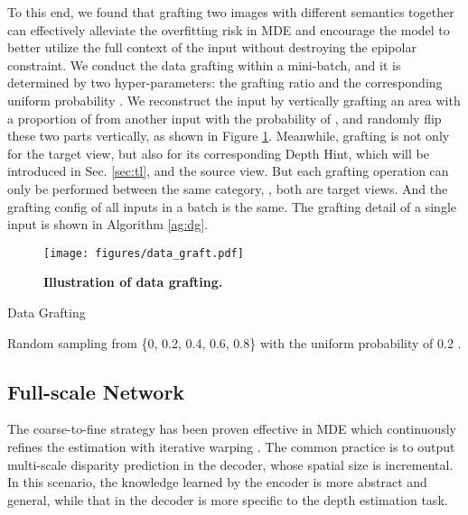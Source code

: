 \documentclass[10pt,twocolumn,letterpaper]{article}
\begin{document}
To this end, we found that grafting two images with different semantics together can 
effectively alleviate the overfitting risk in MDE and encourage the model to better 
utilize the full context of the input without destroying the epipolar constraint. 
We conduct the data grafting within a 
mini-batch, and it is determined by two hyper-parameters: the grafting ratio  and the 
corresponding uniform probability . We reconstruct the input by vertically grafting 
an area with a proportion of  from another input with the probability of , and 
randomly flip these two parts vertically, as shown in Figure \ref{fig:dg}. 
Meanwhile, grafting is not only for the target view, but also for its corresponding 
Depth Hint, which will be introduced in Sec. \ref{sec:tl}, and the source view. 
But each grafting operation can only be performed between the same category, 
\eg, both are target views. And the grafting 
config of all inputs in a batch is the same. The grafting detail of a single 
input is shown in Algorithm \ref{ag:dg}.

\begin{figure}[t]
   \begin{center}
      \texttt{[image: figures/data\_graft.pdf]}
   \end{center}
   \vspace{-0.3cm}
      \caption{{\bf Illustration of data grafting.} }
   \label{fig:dg}
   \vspace{-0.4cm}
\end{figure}

\begin{algorithm}
   \label{ag:dg}
   \caption{Data Grafting}
   \LinesNumbered
   Random sampling  from \{0, 0.2, 0.4, 0.6, 0.8\} with the uniform probability of 0.2\;
   \KwRet{}.
\end{algorithm}

\subsection{Full-scale Network}

The coarse-to-fine strategy has been proven effective in MDE which continuously refines 
the estimation with iterative warping \cite{Garg2016,Godard2017,Godard2019,Watson2019}. 
The common practice is to output multi-scale 
disparity prediction in the decoder, whose spatial size is incremental. In this 
scenario, the knowledge learned by the encoder is more abstract and general, 
while that in the decoder is more specific to the depth estimation task.
\end{document}
